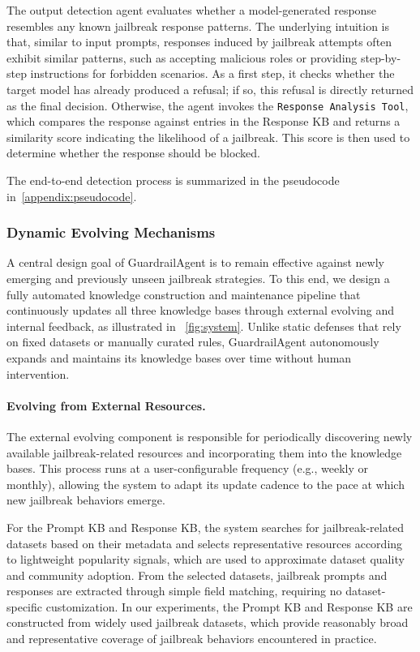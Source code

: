 \documentclass[letterpaper,twocolumn,10pt]{article}
\newcommand{\mypara}[1]{\noindent{\bf {#1}.} \xspace}
\newcommand{\agentname}{GuardrailAgent\xspace}
\newcommand{\outputagent}{OutputAgent\xspace}
\begin{document}
\mypara{\outputagent}
The output detection agent evaluates whether a model-generated response resembles any known jailbreak response patterns.
The underlying intuition is that, similar to input prompts, responses induced by jailbreak attempts often exhibit similar patterns, such as accepting malicious roles or providing step-by-step instructions for forbidden scenarios.
As a first step, it checks whether the target model has already produced a refusal; if so, this refusal is directly returned as the final decision.
Otherwise, the agent invokes the \texttt{Response Analysis Tool}, which compares the response against entries in the Response KB and returns a similarity score indicating the likelihood of a jailbreak.
This score is then used to determine whether the response should be blocked.

The end-to-end detection process is summarized in the pseudocode in~\autoref{appendix:pseudocode}.

\subsubsection{Dynamic Evolving Mechanisms}
\label{section:evolve_comp}

A central design goal of \agentname is to remain effective against newly emerging and previously unseen jailbreak strategies.
To this end, we design a fully automated knowledge construction and maintenance pipeline that continuously updates all three knowledge bases through external evolving and internal feedback, as illustrated in ~\autoref{fig:system}.
Unlike static defenses that rely on fixed datasets or manually curated rules, \agentname autonomously expands and maintains its knowledge bases over time without human intervention.

\paragraph{Evolving from External Resources.}
The external evolving component is responsible for periodically discovering newly available jailbreak-related resources and incorporating them into the knowledge bases.
This process runs at a user-configurable frequency (e.g., weekly or monthly), allowing the system to adapt its update cadence to the pace at which new jailbreak behaviors emerge.

For the Prompt KB and Response KB, the system searches for jailbreak-related datasets based on their metadata and selects representative resources according to lightweight popularity signals, which are used to approximate dataset quality and community adoption.
From the selected datasets, jailbreak prompts and responses are extracted through simple field matching, requiring no dataset-specific customization.
In our experiments, the Prompt KB and Response KB are constructed from widely used jailbreak datasets, which provide reasonably broad and representative coverage of jailbreak behaviors encountered in practice.
\end{document}
